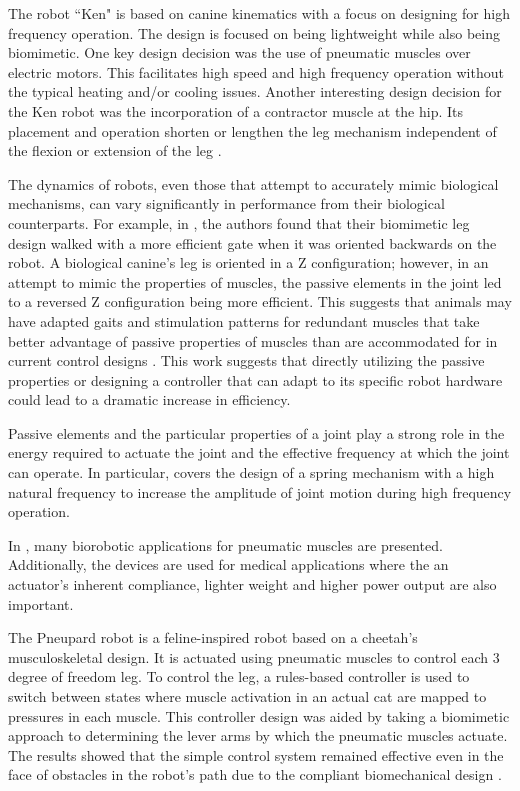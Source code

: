 The robot ``Ken" is based on canine kinematics with a focus on designing for
high frequency operation. The design is focused on being lightweight while also
being biomimetic. One key design decision was the use of pneumatic muscles over
electric motors. This facilitates high speed and high frequency operation
without the typical heating and/or cooling issues. Another interesting design
decision for the Ken robot was the incorporation of a contractor muscle at the
hip. Its placement and operation shorten or lengthen the leg mechanism
independent of the flexion or extension of the leg \cite{Narioka2012}.


The dynamics of robots, even those that attempt to accurately mimic biological mechanisms, can vary significantly in performance from their biological counterparts. For example, in \cite{HindLegMorphology}, the authors found that their biomimetic leg design walked with a more efficient gate when it was oriented backwards on the robot. A biological canine's leg is oriented in a Z configuration; however, in an attempt to mimic the properties of muscles, the passive elements in the joint led to a reversed Z configuration being more efficient. This suggests that animals may have adapted gaits and stimulation patterns for redundant muscles that take better advantage of passive properties of muscles than are accommodated for in current control designs \cite{HindLegMorphology}. This work suggests that directly utilizing the passive properties or designing a controller that can adapt to its specific robot hardware could lead to a dramatic increase in efficiency.

Passive elements and the particular properties of a joint play a strong role in
the energy required to actuate the joint and the effective frequency at which the joint
can operate. In particular, \cite{Na2015} covers the design of a spring
mechanism with a high natural frequency to increase the amplitude of joint
motion during high frequency operation.


In \cite{PAMApplicationSurvey}, many biorobotic applications for pneumatic
muscles are presented.
Additionally, the devices are used for medical applications where the an actuator's
inherent compliance, lighter weight and higher power output are also important. 

The Pneupard robot is a feline-inspired robot based on a cheetah's
musculoskeletal design. It is actuated using pneumatic muscles to control each 3
degree of freedom leg. To control the leg, a rules-based controller is used to switch between
states where muscle activation in an actual cat are mapped to pressures in each
muscle. This controller design was aided by taking a biomimetic approach to determining the lever
arms by which the pneumatic muscles actuate. The results showed that the simple
control system remained effective even in the face of obstacles in the robot's
path due to the compliant biomechanical design \cite{Pneupard2013}.


